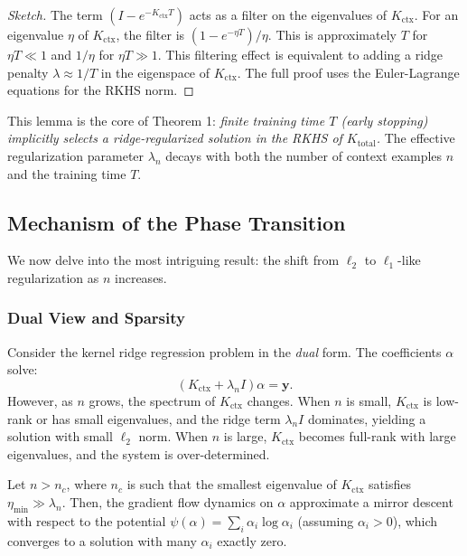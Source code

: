 	\begin{proof}[Sketch]
		The term $(I - e^{-K_{\text{ctx}} T})$ acts as a filter on the eigenvalues of $K_{\text{ctx}}$. For an eigenvalue $\eta$ of $K_{\text{ctx}}$, the filter is $(1 - e^{-\eta T})/\eta$. This is approximately $T$ for $\eta T \ll 1$ and $1/\eta$ for $\eta T \gg 1$. This filtering effect is equivalent to adding a ridge penalty $\lambda \approx 1/T$ in the eigenspace of $K_{\text{ctx}}$. The full proof uses the Euler-Lagrange equations for the RKHS norm.
	\end{proof}
	
	This lemma is the core of Theorem 1: \textit{finite training time $T$ (early stopping) implicitly selects a ridge-regularized solution in the RKHS of $K_{\text{total}}$.} The effective regularization parameter $\lambda_n$ decays with both the number of context examples $n$ and the training time $T$.
	
	\subsection{Mechanism of the Phase Transition}
	\label{subsec:phase_transition_mech}
	
	We now delve into the most intriguing result: the shift from $\ell_2$ to $\ell_1$-like regularization as $n$ increases.
	
	\subsubsection{Dual View and Sparsity}
	\label{subsubsec:dual_view}
	
	Consider the kernel ridge regression problem in the \textit{dual} form. The coefficients $\alpha$ solve:
	\[
	(K_{\text{ctx}} + \lambda_n I) \alpha = \mathbf{y}.
	\]
	However, as $n$ grows, the spectrum of $K_{\text{ctx}}$ changes. When $n$ is small, $K_{\text{ctx}}$ is low-rank or has small eigenvalues, and the ridge term $\lambda_n I$ dominates, yielding a solution with small $\ell_2$ norm. When $n$ is large, $K_{\text{ctx}}$ becomes full-rank with large eigenvalues, and the system is over-determined.
	
	\begin{proposition}
		\label{prop:sparsity}
		Let $n > n_c$, where $n_c$ is such that the smallest eigenvalue of $K_{\text{ctx}}$ satisfies $\eta_{\min} \gg \lambda_n$. Then, the gradient flow dynamics on $\alpha$ approximate a mirror descent with respect to the potential $\psi(\alpha) = \sum_i \alpha_i \log \alpha_i$ (assuming $\alpha_i > 0$), which converges to a solution with many $\alpha_i$ exactly zero.
	\end{proposition}
	
